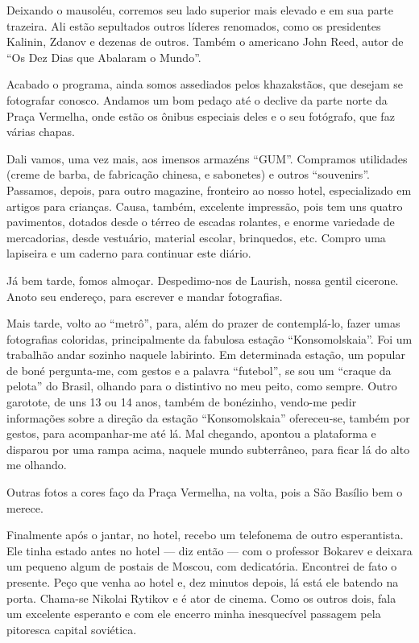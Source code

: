 Deixando o mausoléu, corremos seu lado superior mais elevado e em sua parte trazeira. Ali estão sepultados outros líderes renomados, como os presidentes Kalinin, Zdanov e dezenas de outros. Também o americano John Reed, autor de ``Os Dez Dias que Abalaram o Mundo''.

Acabado o programa, ainda somos assediados pelos khazakstãos, que desejam se fotografar conosco. Andamos um bom pedaço até o declive da parte norte da Praça Vermelha, onde estão os ônibus especiais deles e o seu fotógrafo, que faz várias chapas.

Dali vamos, uma vez mais, aos imensos armazéns ``GUM''. Compramos utilidades (creme de barba, de fabricação chinesa, e sabonetes) e outros ``souvenirs''. Passamos, depois, para outro magazine, fronteiro ao nosso hotel, especializado em artigos para crianças. Causa, também, excelente impressão, pois tem uns quatro pavimentos, dotados desde o térreo de escadas rolantes, e enorme variedade de mercadorias, desde vestuário, material escolar, brinquedos, etc. Compro uma lapiseira e um caderno para continuar este diário.

Já bem tarde, fomos almoçar. Despedimo-nos de Laurish, nossa gentil cicerone. Anoto seu endereço, para escrever e mandar fotografias.

Mais tarde, volto ao ``metrô'', para, além do prazer de contemplá-lo, fazer umas fotografias coloridas, principalmente da fabulosa estação ``Konsomolskaia''. Foi um trabalhão andar sozinho naquele labirinto. Em determinada estação, um popular de boné pergunta-me, com gestos e a palavra ``futebol'', se sou um ``craque da pelota'' do Brasil, olhando para o distintivo no meu peito, como sempre. Outro garotote, de uns 13 ou 14 anos, também de bonézinho, vendo-me pedir informações sobre a direção da estação ``Konsomolskaia'' ofereceu-se, também por gestos, para acompanhar-me até lá. Mal chegando, apontou a plataforma e disparou por uma rampa acima, naquele mundo subterrâneo, para ficar lá do alto me olhando.

Outras fotos a cores faço da Praça Vermelha, na volta, pois a São Basílio bem o merece.

Finalmente após o jantar, no hotel, recebo um telefonema de outro esperantista. Ele tinha estado antes no hotel --- diz então --- com o professor Bokarev e deixara um pequeno algum de postais de Moscou, com dedicatória. Encontrei de fato o presente. Peço que venha ao hotel e, dez minutos depois, lá está ele batendo na porta. Chama-se Nikolai Rytikov e é ator de cinema. Como os outros dois, fala um excelente esperanto e com ele encerro minha inesquecível passagem pela pitoresca capital soviética.

